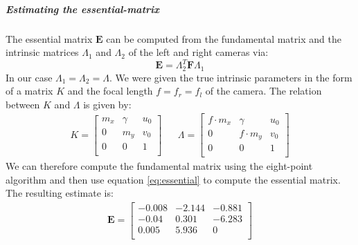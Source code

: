 \documentclass{paper}
\begin{document}
\subparagraph{Estimating the essential-matrix} 
The essential matrix $\mathbf{E}$ can be computed from the fundamental matrix and the intrinsic matrices $\Lambda_1$ and $\Lambda_2$ of the left and right cameras via:
\begin{equation} 
\mathbf{E} =\Lambda_2^T \mathbf{F} \Lambda_1
\label{eq:essential}
\end{equation}
In our case $\Lambda_1=\Lambda_2=\Lambda$.
We were given the true intrinsic parameters in the form of a matrix $K$ and the focal length $f=f_r=f_l$ of the camera. The relation between $K$ and $\Lambda$ is given by:
\begin{align}
K= \left[ \begin{array}{ccc}
m_x & \gamma & u_0\\
0 & m_y & v_0 \\
0 & 0 & 1 \\
\end{array} \right] \nonumber 
&& \Lambda= \left[ \begin{array}{ccc}
f\cdot m_x & \gamma & u_0\\
0 & f\cdot m_y & v_0 \\
0 & 0 & 1 \\
\end{array} \right] \nonumber 
\end{align}
We can therefore compute the fundamental matrix using the eight-point algorithm and then use equation \ref{eq:essential} to compute the essential matrix. The resulting estimate is:
\begin{align}
\mathbf{E}= \left[ \begin{array}{ccc}
-0.008 & -2.144 & -0.881\\
-0.04 & 0.301 & -6.283 \\
0.005 & 5.936 & 0 \\
\end{array} \right] \nonumber 
\end{align}
\end{document}
